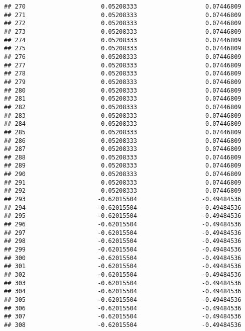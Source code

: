 \documentclass[]{article}
\begin{document}
\begin{verbatim}
## 270                     0.05208333                   0.07446809
## 271                     0.05208333                   0.07446809
## 272                     0.05208333                   0.07446809
## 273                     0.05208333                   0.07446809
## 274                     0.05208333                   0.07446809
## 275                     0.05208333                   0.07446809
## 276                     0.05208333                   0.07446809
## 277                     0.05208333                   0.07446809
## 278                     0.05208333                   0.07446809
## 279                     0.05208333                   0.07446809
## 280                     0.05208333                   0.07446809
## 281                     0.05208333                   0.07446809
## 282                     0.05208333                   0.07446809
## 283                     0.05208333                   0.07446809
## 284                     0.05208333                   0.07446809
## 285                     0.05208333                   0.07446809
## 286                     0.05208333                   0.07446809
## 287                     0.05208333                   0.07446809
## 288                     0.05208333                   0.07446809
## 289                     0.05208333                   0.07446809
## 290                     0.05208333                   0.07446809
## 291                     0.05208333                   0.07446809
## 292                     0.05208333                   0.07446809
## 293                    -0.62015504                  -0.49484536
## 294                    -0.62015504                  -0.49484536
## 295                    -0.62015504                  -0.49484536
## 296                    -0.62015504                  -0.49484536
## 297                    -0.62015504                  -0.49484536
## 298                    -0.62015504                  -0.49484536
## 299                    -0.62015504                  -0.49484536
## 300                    -0.62015504                  -0.49484536
## 301                    -0.62015504                  -0.49484536
## 302                    -0.62015504                  -0.49484536
## 303                    -0.62015504                  -0.49484536
## 304                    -0.62015504                  -0.49484536
## 305                    -0.62015504                  -0.49484536
## 306                    -0.62015504                  -0.49484536
## 307                    -0.62015504                  -0.49484536
## 308                    -0.62015504                  -0.49484536

\end{verbatim}
\end{document}
